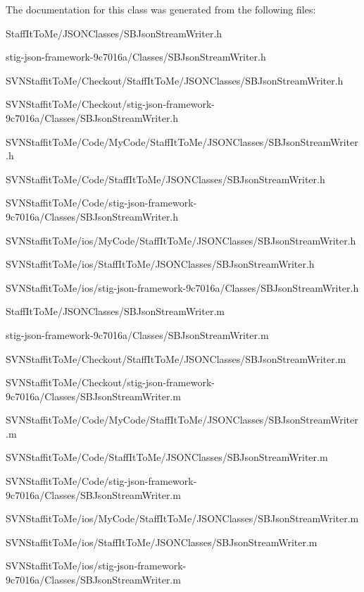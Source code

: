\-The documentation for this class was generated from the following files\-:\begin{DoxyCompactItemize}
\item 
\-Staff\-It\-To\-Me/\-J\-S\-O\-N\-Classes/\-S\-B\-Json\-Stream\-Writer.\-h\item 
stig-\/json-\/framework-\/9c7016a/\-Classes/\-S\-B\-Json\-Stream\-Writer.\-h\item 
\-S\-V\-N\-Staffit\-To\-Me/\-Checkout/\-Staff\-It\-To\-Me/\-J\-S\-O\-N\-Classes/\-S\-B\-Json\-Stream\-Writer.\-h\item 
\-S\-V\-N\-Staffit\-To\-Me/\-Checkout/stig-\/json-\/framework-\/9c7016a/\-Classes/\-S\-B\-Json\-Stream\-Writer.\-h\item 
\-S\-V\-N\-Staffit\-To\-Me/\-Code/\-My\-Code/\-Staff\-It\-To\-Me/\-J\-S\-O\-N\-Classes/\-S\-B\-Json\-Stream\-Writer.\-h\item 
\-S\-V\-N\-Staffit\-To\-Me/\-Code/\-Staff\-It\-To\-Me/\-J\-S\-O\-N\-Classes/\-S\-B\-Json\-Stream\-Writer.\-h\item 
\-S\-V\-N\-Staffit\-To\-Me/\-Code/stig-\/json-\/framework-\/9c7016a/\-Classes/\-S\-B\-Json\-Stream\-Writer.\-h\item 
\-S\-V\-N\-Staffit\-To\-Me/ios/\-My\-Code/\-Staff\-It\-To\-Me/\-J\-S\-O\-N\-Classes/\-S\-B\-Json\-Stream\-Writer.\-h\item 
\-S\-V\-N\-Staffit\-To\-Me/ios/\-Staff\-It\-To\-Me/\-J\-S\-O\-N\-Classes/\-S\-B\-Json\-Stream\-Writer.\-h\item 
\-S\-V\-N\-Staffit\-To\-Me/ios/stig-\/json-\/framework-\/9c7016a/\-Classes/\-S\-B\-Json\-Stream\-Writer.\-h\item 
\-Staff\-It\-To\-Me/\-J\-S\-O\-N\-Classes/\-S\-B\-Json\-Stream\-Writer.\-m\item 
stig-\/json-\/framework-\/9c7016a/\-Classes/\-S\-B\-Json\-Stream\-Writer.\-m\item 
\-S\-V\-N\-Staffit\-To\-Me/\-Checkout/\-Staff\-It\-To\-Me/\-J\-S\-O\-N\-Classes/\-S\-B\-Json\-Stream\-Writer.\-m\item 
\-S\-V\-N\-Staffit\-To\-Me/\-Checkout/stig-\/json-\/framework-\/9c7016a/\-Classes/\-S\-B\-Json\-Stream\-Writer.\-m\item 
\-S\-V\-N\-Staffit\-To\-Me/\-Code/\-My\-Code/\-Staff\-It\-To\-Me/\-J\-S\-O\-N\-Classes/\-S\-B\-Json\-Stream\-Writer.\-m\item 
\-S\-V\-N\-Staffit\-To\-Me/\-Code/\-Staff\-It\-To\-Me/\-J\-S\-O\-N\-Classes/\-S\-B\-Json\-Stream\-Writer.\-m\item 
\-S\-V\-N\-Staffit\-To\-Me/\-Code/stig-\/json-\/framework-\/9c7016a/\-Classes/\-S\-B\-Json\-Stream\-Writer.\-m\item 
\-S\-V\-N\-Staffit\-To\-Me/ios/\-My\-Code/\-Staff\-It\-To\-Me/\-J\-S\-O\-N\-Classes/\-S\-B\-Json\-Stream\-Writer.\-m\item 
\-S\-V\-N\-Staffit\-To\-Me/ios/\-Staff\-It\-To\-Me/\-J\-S\-O\-N\-Classes/\-S\-B\-Json\-Stream\-Writer.\-m\item 
\-S\-V\-N\-Staffit\-To\-Me/ios/stig-\/json-\/framework-\/9c7016a/\-Classes/\-S\-B\-Json\-Stream\-Writer.\-m\end{DoxyCompactItemize}
